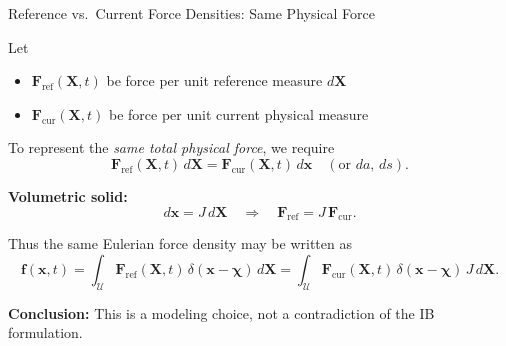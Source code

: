 \documentclass{beamer}
\begin{document}
\begin{frame}{Reference vs.\ Current Force Densities: Same Physical Force}
\small

Let
\begin{itemize}
    \item $\mathbf{F}_{\mathrm{ref}}(\mathbf{X},t)$ be force per unit reference measure $d\mathbf{X}$
    \item $\mathbf{F}_{\mathrm{cur}}(\mathbf{X},t)$ be force per unit current physical measure
\end{itemize}

\medskip

To represent the \emph{same total physical force}, we require
\[
\mathbf{F}_{\mathrm{ref}}(\mathbf{X},t)\,d\mathbf{X}
=
\mathbf{F}_{\mathrm{cur}}(\mathbf{X},t)\,d\mathbf{x}
\quad
(\text{or } da,\, ds).
\]

\medskip

\textbf{Volumetric solid:}
\[
d\mathbf{x}=J\,d\mathbf{X}
\quad\Longrightarrow\quad
\mathbf{F}_{\mathrm{ref}} = J\,\mathbf{F}_{\mathrm{cur}}.
\]

\medskip

Thus the same Eulerian force density may be written as
\[
\mathbf{f}(\mathbf{x},t)
=
\int_{\mathcal{U}}
\mathbf{F}_{\mathrm{ref}}(\mathbf{X},t)\,
\delta(\mathbf{x}-\boldsymbol{\chi})\,d\mathbf{X}
=
\int_{\mathcal{U}}
\mathbf{F}_{\mathrm{cur}}(\mathbf{X},t)\,
\delta(\mathbf{x}-\boldsymbol{\chi})\,J\,d\mathbf{X}.
\]

\medskip

\textbf{Conclusion:}
This is a modeling choice, not a contradiction of the IB formulation.

\end{frame}




\end{document}
